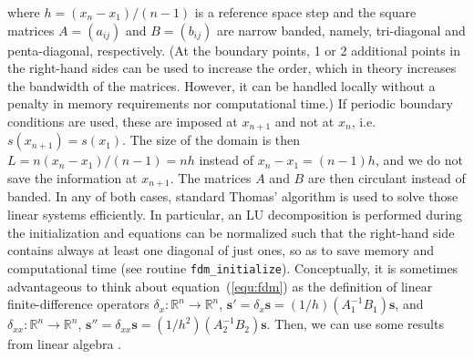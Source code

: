 where $h=(x_n-x_1)/(n-1)$ is a reference space step and the square matrices $A=(a_{ij})$ and $B=(b_{ij})$ are narrow banded, namely, tri-diagonal and penta-diagonal, respectively. (At the boundary points, 1 or 2 additional points in the right-hand sides can be used to increase the order, which in theory increases the bandwidth of the matrices. However, it can be handled locally without a penalty in memory requirements nor computational time.)  If periodic boundary conditions are used, these are imposed at $x_{n+1}$ and not at $x_n$, i.e.  $s(x_{n+1})=s(x_1)$. The size of the domain is then $L=n(x_n-x_1)/(n-1)=nh$ instead of $x_n-x_1=(n-1)h$, and we do not save the information at $x_{n+1}$. The matrices $A$ and $B$ are then circulant instead of banded.  In any of both cases, standard Thomas' algorithm is used to solve those linear systems efficiently. In particular, an LU decomposition is performed during the initialization and equations can be normalized such that the right-hand side contains always at least one diagonal of just ones, so as to save memory and computational time (see routine {\tt   fdm\_initialize}). Conceptually, it is sometimes advantageous to think about equation~(\ref{equ:fdm}) as the definition of linear finite-difference operators $\delta_x: \mathbb{R}^n \rightarrow \mathbb{R}^n$, $\mathbf{s'} = \delta_x\mathbf{s} = (1/h)(A_1^{-1}B_1)\mathbf{s}$, and $\delta_{xx}: \mathbb{R}^n \rightarrow \mathbb{R}^n$, $\mathbf{s''} = \delta_{xx}\mathbf{s} = (1/h^2)(A_2^{-1}B_2)\mathbf{s}$. Then, we can use some results from linear algebra \citep{Mellado:2012}.

